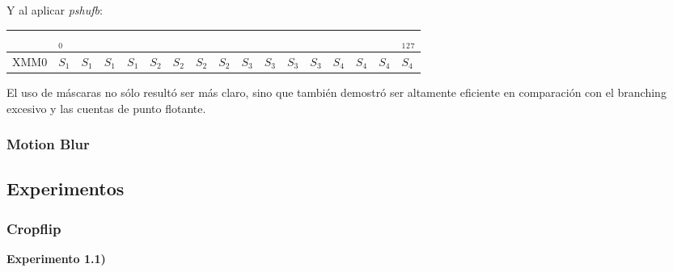 \documentclass[a4paper]{article}
\begin{document}
\begin{itemize}
\begin{itemize}
\begin{table}[h]
\center
Y al aplicar \textit{pshufb}:
\begin{tabular}{lllllllllllllllll}
                           & $_0$                       &                        &                        &                        &                            &                        &                        &                        &                            &                        &                        &                        &                            &                        &                        & $_1$$_2$$_7$                    \\ \hline
\multicolumn{1}{|l|}{XMM0} & \multicolumn{1}{l|}{$S_1$} & \multicolumn{1}{l|}{$S_1$} & \multicolumn{1}{l|}{$S_1$} & \multicolumn{1}{l|}{$S_1$} & \multicolumn{1}{l|}{$S_2$} & \multicolumn{1}{l|}{$S_2$} & \multicolumn{1}{l|}{$S_2$} & \multicolumn{1}{l|}{$S_2$} & \multicolumn{1}{l|}{$S_3$} & \multicolumn{1}{l|}{$S_3$} & \multicolumn{1}{l|}{$S_3$} & \multicolumn{1}{l|}{$S_3$} & \multicolumn{1}{l|}{$S_4$} & \multicolumn{1}{l|}{$S_4$} & \multicolumn{1}{l|}{$S_4$} & \multicolumn{1}{l|}{$S_4$} \\ \hline
\end{tabular}
\end{table}

El uso de m\'{a}scaras no s\'{o}lo result\'{o} ser m\'{a}s claro, sino que tambi\'{e}n demostr\'{o} ser altamente eficiente en comparaci\'{o}n con el branching excesivo y las cuentas de punto flotante.
\end{itemize}
\end{itemize}

\subsubsection{Motion Blur}

\newpage

\subsection{Experimentos}

\subsubsection{Cropflip}

\textbf{Experimento 1.1)}\\
\end{document}
